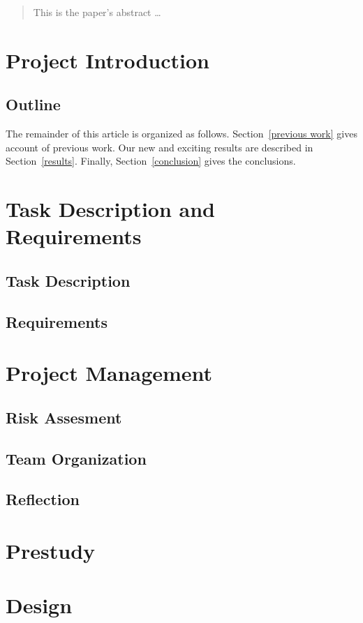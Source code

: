 \documentclass[12pt]{article}
\begin{document}
\newpage
\begin{abstract}\label{abstract}
This is the paper's abstract \ldots
\end{abstract}

\tableofcontents
\newpage

\section{Project Introduction}\label{intoduction}
\subsection{Outline}\label{outline} 
The remainder of this article is organized as follows. Section~\ref{previous work} gives account of previous work. Our new and exciting results are described in Section~\ref{results}. Finally, Section~\ref{conclusion} gives the conclusions.

\section{Task Description and Requirements}\label{tanskreq}
\subsection{Task Description}\label{task}
\subsection{Requirements}\label{requirements}
\section{Project Management}\label{management}
\subsection{Risk Assesment}\label{risk}
\subsection{Team Organization}\label{team}
\subsection{Reflection}\label{}
\section{Prestudy}\label{prestudy}
\section{Design}\label{design}
\end{document}
